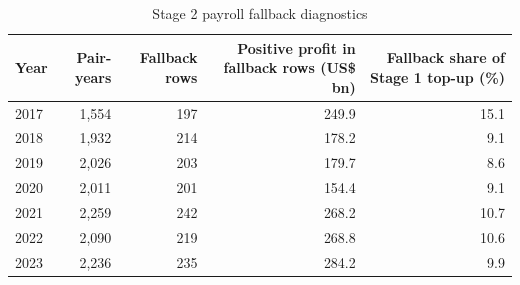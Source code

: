 \begin{table}[H]
\centering
\footnotesize
\setlength{\tabcolsep}{3pt}
\caption{Stage 2 payroll fallback diagnostics}
\label{tab:app_stage2_payroll_fallback}
\begin{tabular}{@{}lrrrr@{}}
\toprule
Year & Pair-years & Fallback rows & Positive profit in fallback rows (US\$ bn) & Fallback share of Stage 1 top-up (\%) \\
\midrule
2017 & 1,554 & 197 & 249.9 & 15.1 \\
2018 & 1,932 & 214 & 178.2 &  9.1 \\
2019 & 2,026 & 203 & 179.7 &  8.6 \\
2020 & 2,011 & 201 & 154.4 &  9.1 \\
2021 & 2,259 & 242 & 268.2 & 10.7 \\
2022 & 2,090 & 219 & 268.8 & 10.6 \\
2023 & 2,236 & 235 & 284.2 &  9.9 \\
\bottomrule
\end{tabular}
\end{table}
